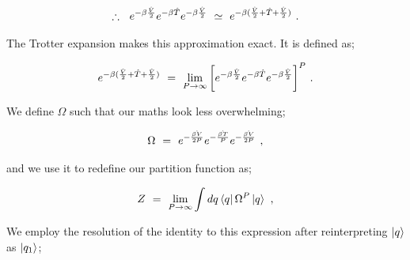\documentclass{article}
\begin{document}
\begin{equation} \label{eb-eq-1-189}
\therefore  \hspace{0.225cm}  e^{-\beta \frac{\hat{V}}{2}} e^{-\beta \hat{T}} e^{-\beta \frac{\hat{V}}{2}} \hspace{0.125cm} \simeq \hspace{0.125cm} e^{-\beta ( \frac{\hat{V}}{2} + \hat{T} + \frac{\hat{V}}{2} )} \hspace{0.125cm} .
\end{equation}

The Trotter expansion makes this approximation exact. It is defined as;

\begin{equation} \label{eb-eq-1-190}
e^{-\beta ( \frac{\hat{V}}{2} + \hat{T} + \frac{\hat{V}}{2} )} \hspace{0.125cm} = \hspace{0.125cm} \lim_{P \rightarrow \infty} \bigg[ e^{-\beta \frac{\hat{V}}{2}} e^{-\beta \hat{T}} e^{-\beta \frac{\hat{V}}{2}} \bigg]^P \hspace{0.125cm} .  
\end{equation}

We define \begin{math} \Omega \end{math} such that our maths look less overwhelming;

\begin{equation} \label{eb-eq-1-191}
\Omega \hspace{0.125cm} = \hspace{0.125cm} e^{-\frac{\hat{\beta V}}{2 P}} e^{- \frac{\hat{\beta T}}{P}} e^{- \frac{\hat{\beta V}}{2 P}} \hspace{0.125cm} , 
\end{equation}

and we use it to redefine our partition function as;

\begin{equation} \label{eb-eq-1-192}
Z \hspace{0.125cm} = \hspace{0.125cm}  \lim_{P \rightarrow \infty} \int dq \bra{q} \Omega^P \ket{q} \hspace{0.125cm} , 
\end{equation}

We employ the resolution of the identity to this expression after reinterpreting \begin{math} \ket{q} \end{math} as \begin{math} \ket{q_1}\end{math}; 
\end{document}
